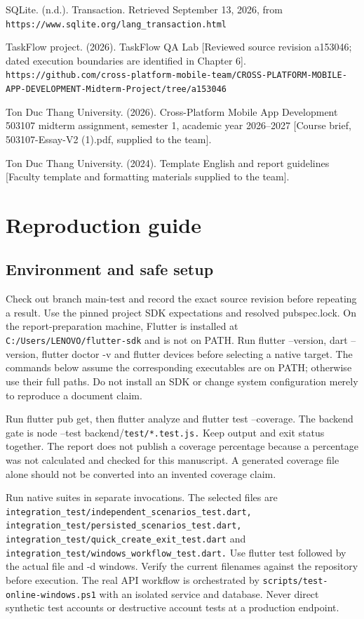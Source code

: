 \documentclass[12pt,a4paper,oneside]{report}
\begin{document}
\noindent\hangindent=0.75cm SQLite. (n.d.). Transaction. Retrieved September 13, 2026, from \nolinkurl{https://www.sqlite.org/lang_transaction.html}\par\medskip
\noindent\hangindent=0.75cm TaskFlow project. (2026). TaskFlow QA Lab [Reviewed source revision a153046; dated execution boundaries are identified in Chapter 6]. \nolinkurl{https://github.com/cross-platform-mobile-team/CROSS-PLATFORM-MOBILE-APP-DEVELOPMENT-Midterm-Project/tree/a153046}\par\medskip
\noindent\hangindent=0.75cm Ton Duc Thang University. (2026). Cross-Platform Mobile App Development 503107 midterm assignment, semester 1, academic year 2026–2027 [Course brief, 503107-Essay-V2 (1).pdf, supplied to the team].\par\medskip
\noindent\hangindent=0.75cm Ton Duc Thang University. (2024). Template English and report guidelines [Faculty template and formatting materials supplied to the team].\par\medskip
\appendix
\chapter{Reproduction guide}
\section{Environment and safe setup}
Check out branch main-test and record the exact source revision before repeating a result. Use the pinned project SDK expectations and resolved pubspec.lock. On the report-preparation machine, Flutter is installed at \nolinkurl{C:/Users/LENOVO/flutter-sdk} and is not on PATH. Run flutter --version, dart --version, flutter doctor -v and flutter devices before selecting a native target. The commands below assume the corresponding executables are on PATH; otherwise use their full paths. Do not install an SDK or change system configuration merely to reproduce a document claim.

Run flutter pub get, then flutter analyze and flutter test --coverage. The backend gate is node --test backend/\nolinkurl{test/*.test.js.} Keep output and exit status together. The report does not publish a coverage percentage because a percentage was not calculated and checked for this manuscript. A generated coverage file alone should not be converted into an invented coverage claim.

Run native suites in separate invocations. The selected files are \nolinkurl{integration_test/independent_scenarios_test.dart,} \nolinkurl{integration_test/persisted_scenarios_test.dart,} \nolinkurl{integration_test/quick_create_exit_test.dart} and \nolinkurl{integration_test/windows_workflow_test.dart.} Use flutter test followed by the actual file and -d windows. Verify the current filenames against the repository before execution. The real API workflow is orchestrated by \nolinkurl{scripts/test-online-windows.ps1} with an isolated service and database. Never direct synthetic test accounts or destructive account tests at a production endpoint.
\end{document}
